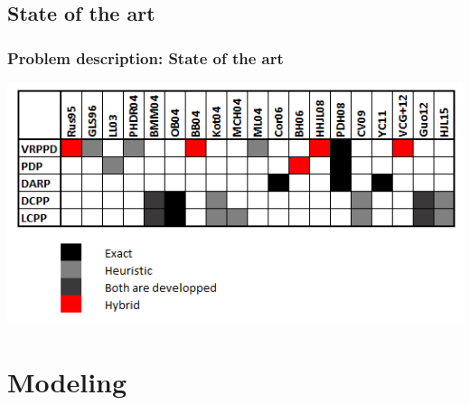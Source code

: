 \documentclass{beamer}
\begin{document}
	\subsection{State of the art}
	\begin{frame}
		\frametitle{Problem description: State of the art}
		\includegraphics[height=0.5\textwidth]{img/i_table.png}
	\end{frame}
	
	\section{Modeling}
\end{document}
